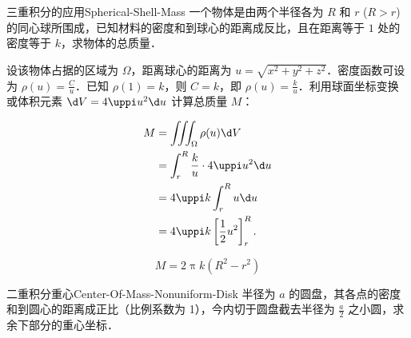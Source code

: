 \begin{problem}{三重积分的应用}{Spherical-Shell-Mass}
    一个物体是由两个半径各为 $R$ 和 $r$ ($R > r$) 的同心球所围成，已知材料的密度和到球心的距离成反比，且在距离等于 $1$ 处的密度等于 $k$，求物体的总质量．
\end{problem}

\begin{solution}
    设该物体占据的区域为 $\Omega$，距离球心的距离为 $u = \sqrt{x^2 + y^2 + z^2}$．密度函数可设为 $\rho(u) = \frac{C}{u}$．已知 $\rho(1) = k$，则 $C = k$，即 $\rho(u) = \frac{k}{u}$．利用球面坐标变换或体积元素 $\d V = 4\uppi u^2 \d u$ 计算总质量 $M$：

    \begin{equation}
        \begin{aligned}
            M & = \iiint_{\Omega} \rho(u) \d V                      \\
              & = \int_{r}^{R} \frac{k}{u} \cdot 4\uppi u^2 \d u    \\
              & = 4\uppi k \int_{r}^{R} u \d u                      \\
              & = 4\uppi k \left[ \frac{1}{2} u^2 \right]_{r}^{R} .
        \end{aligned}
    \end{equation}

    \begin{equation}
        M = \boxed{2\uppi k (R^2 - r^2)}
    \end{equation}
\end{solution}

\begin{problem}{二重积分重心}{Center-Of-Mass-Nonuniform-Disk}
    半径为 $a$ 的圆盘，其各点的密度和到圆心的距离成正比（比例系数为 1），今内切于圆盘截去半径为 $\frac{a}{2}$ 之小圆，求余下部分的重心坐标．
\end{problem}


